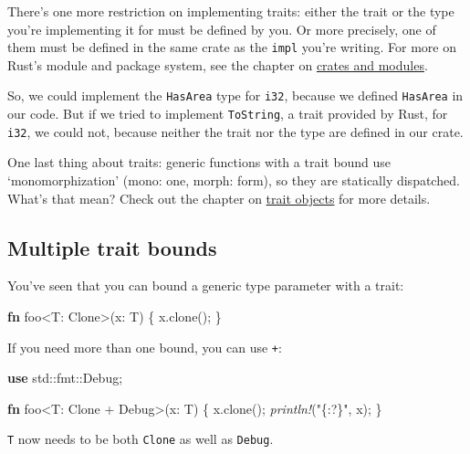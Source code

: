 \documentclass[a4paper,]{book}
\newenvironment{Shaded}{\begin{snugshade}}{\end{snugshade}}
\newcommand{\KeywordTok}[1]{\textcolor[rgb]{0.13,0.29,0.53}{\textbf{{#1}}}}
\newcommand{\StringTok}[1]{\textcolor[rgb]{0.31,0.60,0.02}{{#1}}}
\newcommand{\BuiltInTok}[1]{{#1}}
\newcommand{\PreprocessorTok}[1]{\textcolor[rgb]{0.56,0.35,0.01}{\textit{{#1}}}}
\newcommand{\NormalTok}[1]{{#1}}
\begin{document}
There's one more restriction on implementing traits: either the trait or
the type you're implementing it for must be defined by you. Or more
precisely, one of them must be defined in the same crate as the
\texttt{impl} you're writing. For more on Rust's module and package
system, see the chapter on
\protect\hyperlink{sec--crates-and-modules}{crates and modules}.

So, we could implement the \texttt{HasArea} type for \texttt{i32},
because we defined \texttt{HasArea} in our code. But if we tried to
implement \texttt{ToString}, a trait provided by Rust, for \texttt{i32},
we could not, because neither the trait nor the type are defined in our
crate.

One last thing about traits: generic functions with a trait bound use
`monomorphization' (mono: one, morph: form), so they are statically
dispatched. What's that mean? Check out the chapter on
\protect\hyperlink{sec--trait-objects}{trait objects} for more details.

\subsection{Multiple trait bounds}\label{multiple-trait-bounds}

You've seen that you can bound a generic type parameter with a trait:

\begin{Shaded}
\begin{Highlighting}[]
\KeywordTok{fn} \NormalTok{foo<T: }\BuiltInTok{Clone}\NormalTok{>(x: T) \{}
    \NormalTok{x.clone();}
\NormalTok{\}}
\end{Highlighting}
\end{Shaded}

If you need more than one bound, you can use \texttt{+}:

\begin{Shaded}
\begin{Highlighting}[]
\KeywordTok{use} \NormalTok{std::fmt::}\BuiltInTok{Debug}\NormalTok{;}

\KeywordTok{fn} \NormalTok{foo<T: }\BuiltInTok{Clone} \NormalTok{+ }\BuiltInTok{Debug}\NormalTok{>(x: T) \{}
    \NormalTok{x.clone();}
    \PreprocessorTok{println!}\NormalTok{(}\StringTok{"\{:?\}"}\NormalTok{, x);}
\NormalTok{\}}
\end{Highlighting}
\end{Shaded}

\texttt{T} now needs to be both \texttt{Clone} as well as
\texttt{Debug}.
\end{document}
